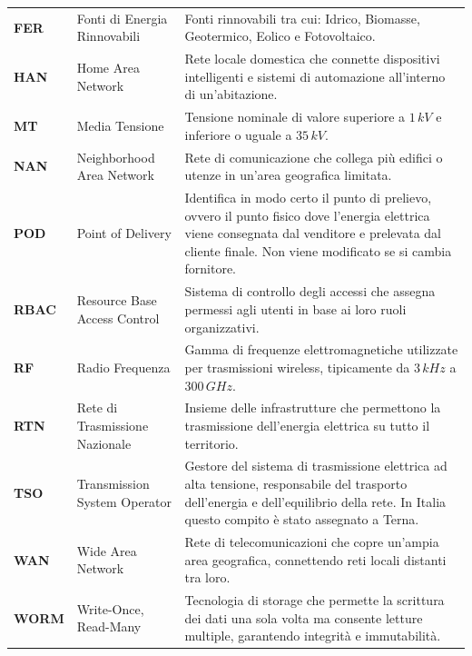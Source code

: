 \begin{longtable}{p{2cm}p{3.5cm}p{10.5cm}}
    \textbf{FER} &  Fonti di Energia Rinnovabili &  Fonti rinnovabili tra cui: Idrico, Biomasse, Geotermico, Eolico e  Fotovoltaico. \\

    \textbf{HAN} &  Home Area Network &  Rete locale domestica che connette dispositivi intelligenti e sistemi di automazione all'interno di un'abitazione. \\

    \textbf{MT} & Media Tensione &  Tensione nominale di valore superiore a $1\,kV$ e inferiore o uguale a $35\,kV$.  \\

    \textbf{NAN} &  Neighborhood Area Network & Rete di comunicazione che collega più edifici o utenze in un'area geografica limitata. \\

    \textbf{POD} &  Point of Delivery & Identifica in modo certo il punto di prelievo, ovvero il punto fisico dove l'energia elettrica viene consegnata dal venditore e prelevata dal cliente finale. Non viene modificato se si cambia fornitore. \\

    \textbf{RBAC} &  Resource Base Access Control  & Sistema di controllo degli accessi che assegna permessi agli utenti in base ai loro ruoli organizzativi.\\

    \textbf{RF} &  Radio Frequenza & Gamma di frequenze elettromagnetiche utilizzate per trasmissioni wireless, tipicamente da $3\,kHz$ a $300\,GHz$. \\

    \textbf{RTN} &  Rete di Trasmissione Nazionale & Insieme delle infrastrutture che permettono la trasmissione dell'energia elettrica su tutto il territorio. \\

    \textbf{TSO} &  Transmission System Operator &  Gestore del sistema di trasmissione elettrica ad alta tensione, responsabile del trasporto dell'energia e dell'equilibrio della rete. In Italia questo compito è stato assegnato a Terna. \\

    \textbf{WAN} &  Wide Area Network & Rete di telecomunicazioni che copre un'ampia area geografica, connettendo reti locali distanti tra loro. \\

    \textbf{WORM} & Write-Once, Read-Many & Tecnologia di storage che permette la scrittura dei dati una sola volta ma consente letture multiple, garantendo integrità e immutabilità. \\

    \hline
\end{longtable}


